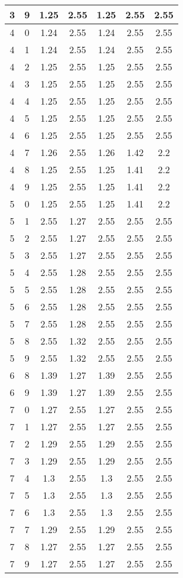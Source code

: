 \begin{longtable}{|c|c||c||c||c|c|c|}
	3 & 9 & 1.25 & 2.55 & 1.25 & 2.55 & 2.55 \\ \hline
	4 & 0 & 1.24 & 2.55 & 1.24 & 2.55 & 2.55 \\ \hline
	4 & 1 & 1.24 & 2.55 & 1.24 & 2.55 & 2.55 \\ \hline
	4 & 2 & 1.25 & 2.55 & 1.25 & 2.55 & 2.55 \\ \hline
	4 & 3 & 1.25 & 2.55 & 1.25 & 2.55 & 2.55 \\ \hline
	4 & 4 & 1.25 & 2.55 & 1.25 & 2.55 & 2.55 \\ \hline
	4 & 5 & 1.25 & 2.55 & 1.25 & 2.55 & 2.55 \\ \hline
	4 & 6 & 1.25 & 2.55 & 1.25 & 2.55 & 2.55 \\ \hline
	4 & 7 & 1.26 & 2.55 & 1.26 & 1.42 & 2.2 \\ \hline
	4 & 8 & 1.25 & 2.55 & 1.25 & 1.41 & 2.2 \\ \hline
	4 & 9 & 1.25 & 2.55 & 1.25 & 1.41 & 2.2 \\ \hline
	5 & 0 & 1.25 & 2.55 & 1.25 & 1.41 & 2.2 \\ \hline
	5 & 1 & 2.55 & 1.27 & 2.55 & 2.55 & 2.55 \\ \hline
	5 & 2 & 2.55 & 1.27 & 2.55 & 2.55 & 2.55 \\ \hline
	5 & 3 & 2.55 & 1.27 & 2.55 & 2.55 & 2.55 \\ \hline
	5 & 4 & 2.55 & 1.28 & 2.55 & 2.55 & 2.55 \\ \hline
	5 & 5 & 2.55 & 1.28 & 2.55 & 2.55 & 2.55 \\ \hline
	5 & 6 & 2.55 & 1.28 & 2.55 & 2.55 & 2.55 \\ \hline
	5 & 7 & 2.55 & 1.28 & 2.55 & 2.55 & 2.55 \\ \hline
	5 & 8 & 2.55 & 1.32 & 2.55 & 2.55 & 2.55 \\ \hline
	5 & 9 & 2.55 & 1.32 & 2.55 & 2.55 & 2.55 \\ \hline
	6 & 8 & 1.39 & 1.27 & 1.39 & 2.55 & 2.55 \\ \hline
	6 & 9 & 1.39 & 1.27 & 1.39 & 2.55 & 2.55 \\ \hline
	7 & 0 & 1.27 & 2.55 & 1.27 & 2.55 & 2.55 \\ \hline
	7 & 1 & 1.27 & 2.55 & 1.27 & 2.55 & 2.55 \\ \hline
	7 & 2 & 1.29 & 2.55 & 1.29 & 2.55 & 2.55 \\ \hline
	7 & 3 & 1.29 & 2.55 & 1.29 & 2.55 & 2.55 \\ \hline
	7 & 4 & 1.3 & 2.55 & 1.3 & 2.55 & 2.55 \\ \hline
	7 & 5 & 1.3 & 2.55 & 1.3 & 2.55 & 2.55 \\ \hline
	7 & 6 & 1.3 & 2.55 & 1.3 & 2.55 & 2.55 \\ \hline
	7 & 7 & 1.29 & 2.55 & 1.29 & 2.55 & 2.55 \\ \hline
	7 & 8 & 1.27 & 2.55 & 1.27 & 2.55 & 2.55 \\ \hline
	7 & 9 & 1.27 & 2.55 & 1.27 & 2.55 & 2.55 \\ \hline
\end{longtable}

